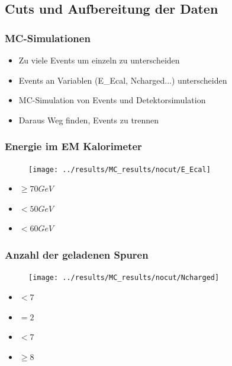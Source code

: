 \subsection{Cuts und Aufbereitung der Daten}
\begin{frame}
	\frametitle{MC-Simulationen}
	\begin{center}
		\begin{itemize}
			\item Zu viele Events um einzeln zu unterscheiden\\\hfill
			\item Events an Variablen (E\_Ecal, Ncharged...) unterscheiden\\\hfill
			\item MC-Simulation von Events und Detektorsimulation\\\hfill
			\item Daraus Weg finden, Events zu trennen
		\end{itemize}
	\end{center}	
\end{frame}
\begin{frame}
	\frametitle{Energie im EM Kalorimeter}
	\begin{figure}
		\centering
		\texttt{[image: ../results/MC\_results/nocut/E\_Ecal]}
	\end{figure}
	\begin{center}
		\begin{itemize}
			\item {} $\ge 70 \unit{GeV}$
			\item {} $< 50 \unit{GeV}$
			\item {} $< 60 \unit{GeV}$
		\end{itemize}
	\end{center}
\end{frame}

\begin{frame}
	\frametitle{Anzahl der geladenen Spuren}
	\begin{figure}
		\centering
		\texttt{[image: ../results/MC\_results/nocut/Ncharged]}
	\end{figure}
	\begin{center}
		\begin{itemize}
			\item {} $<7$
			\item {} $=2$
			\item {} $<7$
			\item {} $\ge8$
		\end{itemize}
	\end{center}
\end{frame}

